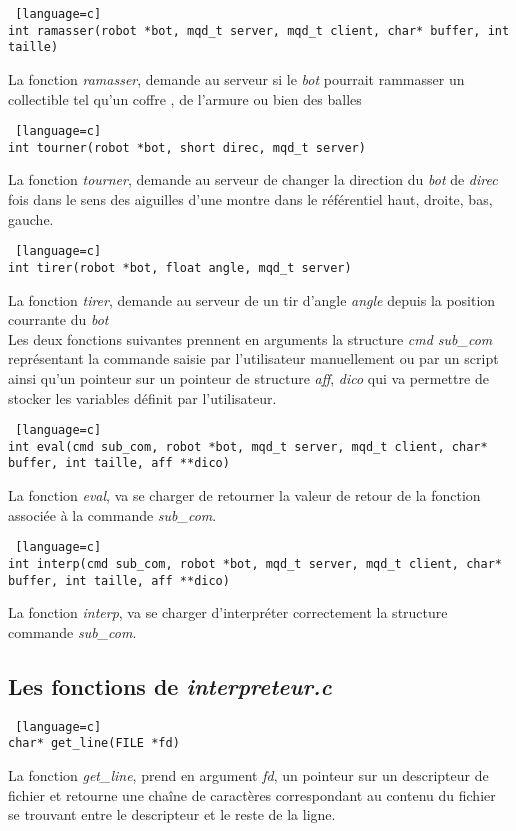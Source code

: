 \documentclass[a4paper, 11pt]{article}
\begin{document}
\begin {lstlisting} [language=c]
int ramasser(robot *bot, mqd_t server, mqd_t client, char* buffer, int taille)
\end{lstlisting}
La fonction \emph{ramasser}, demande au serveur si le \emph{bot} pourrait rammasser un collectible tel qu'un coffre , de l'armure ou bien des balles\\

\begin {lstlisting} [language=c]
int tourner(robot *bot, short direc, mqd_t server)
\end{lstlisting}
La fonction \emph{tourner}, demande au serveur de changer la direction du \emph{bot} de \emph{direc} fois dans le sens des aiguilles d'une montre dans le référentiel haut, droite, bas, gauche.\\

\begin {lstlisting} [language=c]
int tirer(robot *bot, float angle, mqd_t server)
\end{lstlisting}
La fonction \emph{tirer}, demande au serveur de un tir d'angle \emph{angle} depuis la position courrante du  \emph{bot}\\

Les deux fonctions suivantes prennent en arguments la structure \emph{cmd sub\_com} représentant la commande saisie par l'utilisateur manuellement ou par un script ainsi qu'un pointeur sur un pointeur de structure \emph{aff}, \emph{dico} qui va permettre de stocker les variables définit par l'utilisateur.\\

\begin {lstlisting} [language=c]
int eval(cmd sub_com, robot *bot, mqd_t server, mqd_t client, char* buffer, int taille, aff **dico)
\end{lstlisting}
La fonction \emph{eval}, va se charger de retourner la valeur de retour de la fonction associée à la commande \emph{sub\_com}.\\

\begin {lstlisting} [language=c]
int interp(cmd sub_com, robot *bot, mqd_t server, mqd_t client, char* buffer, int taille, aff **dico)
\end{lstlisting}
La fonction \emph{interp}, va se charger d'interpréter correctement la structure commande \emph{sub\_com}.\\

\subsection{Les fonctions de \emph{interpreteur.c}}
\begin {lstlisting} [language=c]
char* get_line(FILE *fd)
\end{lstlisting}
La fonction \emph{get\_line}, prend en argument \emph{fd}, un pointeur sur un descripteur de fichier et retourne une chaîne de caractères correspondant au contenu du fichier se trouvant entre le descripteur et le reste de la ligne.\\
\end{document}
